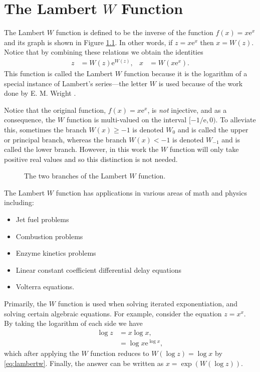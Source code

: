 
\chapter{The Lambert $W$ Function}
\label{chap:lambertw}
The Lambert $W$ function is defined to be the inverse of the function $f(x) = x \textrm{e}^x$ and its graph is shown in Figure \ref{fig:lambertw}. In other words, if $z = x \textrm{e}^x$ then $x = W(z)$. Notice that by combining these relations we obtain the identities
\begin{align}
\label{eq:lambertw}
z &= W(z) \textrm{e}^{W(z)}, & x &= W(x \textrm{e}^x).
\end{align}
This function is called the Lambert $W$ function because it is the logarithm of a special instance of Lambert's series---the letter $W$ is used because of the work done by E. M. Wright \cite{lambertw}.

Notice that the original function, $f(x) = x \textrm{e}^x$, is \emph{not} injective, and as a consequence, the $W$ function is multi-valued on the interval $[-1/\textrm{e},0)$. To alleviate this, sometimes the branch $W(x) \geq -1$ is denoted $W_0$ and is called the upper or principal branch, whereas the branch $W(x) < -1$ is denoted $W_{-1}$ and is called the lower branch. However, in this work the $W$ function will only take positive real values and so this distinction is not needed.

\begin{figure}[htbp]
\centering

\caption{The two branches of the Lambert $W$ function.}
\label{fig:lambertw}
\end{figure}

The Lambert $W$ function has applications in various areas of math and physics \cite{lambertw} including:
\begin{itemize}
\item Jet fuel problems
\item Combustion problems
\item Enzyme kinetics problems
\item Linear constant coefficient differential delay equations
\item Volterra equations.
\end{itemize}
Primarily, the $W$ function is used when solving iterated exponentiation, and solving certain algebraic equations. For example, consider the equation $z = x^x$. By taking the logarithm of each side we have
\begin{align*}
\log z &= x \log x, \\
&= \log x \textrm{e}^{\log x},
\end{align*}
which after applying the $W$ function reduces to $W(\log z) = \log x$ by \eqref{eq:lambertw}. Finally, the answer can be written as $x = \exp(W(\log z))$.

